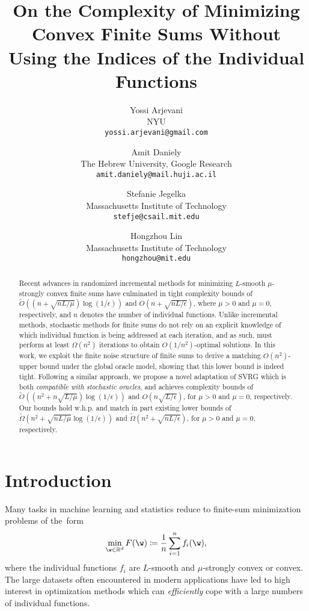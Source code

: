 \documentclass{article}
\author{
 Yossi Arjevani \\
 NYU\\
 \texttt{yossi.arjevani@gmail.com} \\
\and
 Amit Daniely\\
 The Hebrew University, Google Research\\
 \texttt{amit.daniely@mail.huji.ac.il} \\
 \and
 Stefanie Jegelka\\
 Massachusetts Institute of Technology\\
 \texttt{stefje@csail.mit.edu}
 \and
 Hongzhou Lin\\
 Massachusetts Institute of Technology\\
 \texttt{hongzhou@mit.edu} \\
 }
\date{}
\theoremstyle{definition}  \newtheorem{exercise}{Exercise}
\theoremstyle{plain}
\newcommand{\RR}{\mathbb{R}}
\newcommand{\strcvx}{\mu} \newcommand{\query}{B}
\theoremstyle{definition}
\theoremstyle{remark}
\begin{document}
\title{On the Complexity of Minimizing Convex Finite Sums Without \\
Using the Indices of the Individual Functions}

\maketitle

















\begin{abstract}
	Recent advances in randomized incremental methods for minimizing $L$-smooth 
	$\mu$-strongly convex finite sums have culminated in {tight} complexity 
	bounds of $\tilde{O}((n+\sqrt{n L/\mu})\log(1/\epsilon))$ and 	
	$O(n+\sqrt{nL/\epsilon})$, where $\mu>0$ and $\mu=0$, respectively, and $n$ 
	denotes the number of individual functions. Unlike incremental methods, 
	stochastic methods for finite sums do not rely on an explicit knowledge of
	which individual function is being addressed at each iteration, and as 
	such, must perform at least $\Omega(n^2)$ iterations to obtain 
	$O(1/n^2)$-optimal solutions. In this work, we exploit the finite noise 
	structure of finite sums to derive a matching $O(n^2)$-upper bound under 
	the global oracle model, showing that this lower bound is indeed tight. 
	Following a similar approach, we propose a novel 
	adaptation of SVRG which 
	is both \emph{compatible with stochastic oracles}, and achieves complexity 
	bounds of $\tilde{O}((n^2+n\sqrt{L/\mu})\log(1/\epsilon))$ and  
	$O(n\sqrt{L/\epsilon})$, for $\mu>0$ and $\mu=0$, respectively. Our bounds 
	hold w.h.p. and match in part existing lower bounds of $\tilde{\Omega}(n^2+
	\sqrt{nL/\mu}\log(1/\epsilon))$ and $\tilde{\Omega}(n^2+\sqrt{nL/\epsilon})$, for
	$\mu>0$ and $\mu=0$, respectively.
	\end{abstract}






\section{Introduction} \label{sec:intro}


	
	Many tasks in machine learning and statistics reduce to finite-sum 	
	minimization problems of the~form
	\begin{align} \label{opt:fsm}
		\min_{\w\in\RR^d} F(\w) \coloneqq \frac1n\sum_{i=1}^n f_i(\w),
	\end{align}
	where the individual functions $f_i$ are $L$-smooth and 
	$\strcvx$-strongly convex or convex. The large datasets often 
	encountered 
	in modern 
	applications have led to high interest in optimization methods which 
	can \emph{efficiently} cope with a large numbers of individual functions. 
	
\end{document}
